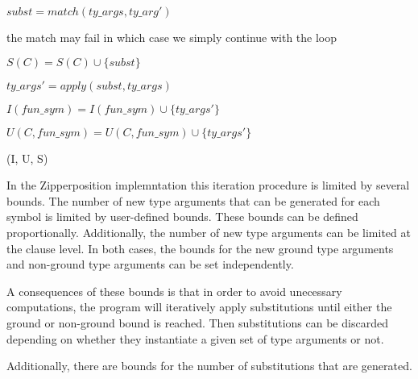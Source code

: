 \documentclass[]{ceurart}
\begin{document}
\begin{algorithm}[tbh]
\begin{algorithmic}[1]
            
            \State \(subst = match(ty\_args, ty\_arg')\)

            \State \Comment the match may fail in which case we simply continue with the loop

            \State \(S(C) = S(C) \cup \{subst\}\)
         \EndFor
      \EndFor
   
   \EndFor

            \State \(ty\_args' = apply(subst, ty\_args)\)


               \State \(I(fun\_sym) = I(fun\_sym) \cup \{ty\_args'\}\)
            \Else

               \State \(U(C, fun\_sym) = U(C, fun\_sym) \cup \{ty\_args'\}\)
            \EndIf

         \EndFor
      \EndFor
   \EndFor

   \State \Return (I, U, S)

\EndFunction
\end{algorithmic}
\end{algorithm}
In the Zipperposition implemntation this iteration procedure is limited by several bounds. The number of new type arguments that can be generated for each symbol is limited by user-defined bounds. These bounds can be defined proportionally. Additionally, the number of new type arguments can be limited at the clause level. In both cases, the bounds for the new ground type arguments and non-ground type arguments can be set independently.

A consequences of these bounds is that in order to avoid unecessary computations, the program will iteratively apply substitutions until either the ground or non-ground bound is reached. Then substitutions can be discarded depending on whether they instantiate a given set of type arguments or not.

Additionally, there are bounds for the number of substitutions that are generated.
\end{document}
